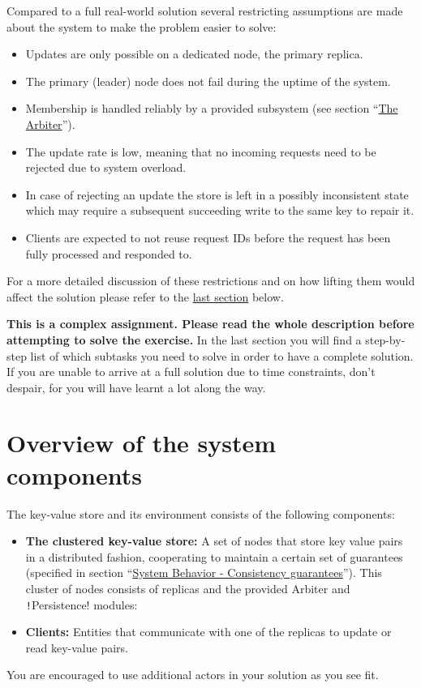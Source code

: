 \documentclass{article}
\begin{document}
Compared to a full real-world solution several restricting assumptions are made about the system to make the problem easier to solve:

\begin{itemize}
  \item Updates are only possible on a dedicated node, the primary replica.
  \item The primary (leader) node does not fail during the uptime of the system.
  \item Membership is handled reliably by a provided subsystem (see section ``\hyperref[s:arbiter]{The Arbiter}'').
  \item The update rate is low, meaning that no incoming requests need to be rejected due to system overload.
  \item In case of rejecting an update  the store is left in a possibly inconsistent state which may require a subsequent succeeding write to the same key to repair it.
  \item Clients are expected to not reuse request IDs before the request has been fully processed and responded to.
\end{itemize}

For a more detailed discussion of these restrictions and on how lifting them would affect the solution please refer to the \hyperref[ss:theeffectoftherestrictions]{last section} below.

\textbf{This is a complex assignment. Please read the whole description before attempting to solve the exercise.} In the last section you will find a step-by-step list of which subtasks you need to solve in order to have a complete solution. If you are unable to arrive at a full solution due to time constraints, don’t despair, for you will have learnt a lot along the way.

\section{Overview of the system components}\label{s:overview}

The key-value store and its environment consists of the following components:
\begin{itemize}
  \item \textbf{The clustered key-value store:} A set of nodes that store key value pairs in a distributed fashion, cooperating to maintain a certain set of guarantees (specified in section ``\hyperref[s:systembehavior]{System Behavior - Consistency guarantees}''). This cluster of nodes consists of replicas and the provided Arbiter and \texttt!Persistence! modules:

  \item \textbf{Clients:} Entities that communicate with one of the replicas to update or read key-value pairs.
\end{itemize}
You are encouraged to use additional actors in your solution as you see fit.
\end{document}
